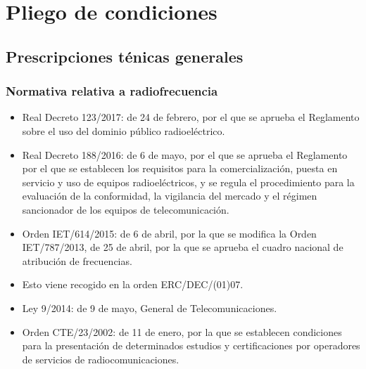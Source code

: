 \documentclass[paper=a4, fontsize=11pt,twoside]{scrartcl}	%
\begin{document}
\section{Pliego de condiciones}
    \subsection{Prescripciones ténicas generales}
        \subsubsection{Normativa relativa a radiofrecuencia}
            \begin{itemize}
                \item Real Decreto 123/2017: de 24 de febrero, por el que se aprueba el Reglamento
                sobre el uso del dominio público radioeléctrico.
                \item Real Decreto 188/2016: de 6 de mayo, por el que se aprueba el Reglamento 
                por el que se establecen los requisitos para la comercialización, puesta en servicio 
                y uso de equipos radioeléctricos, y se regula el procedimiento para la evaluación de
                la conformidad, la vigilancia del mercado y el régimen sancionador de los equipos de
                telecomunicación.
                \item Orden IET/614/2015: de 6 de abril, por la que se modifica la Orden IET/787/2013,
                de 25 de abril, por la que se aprueba el cuadro nacional de atribución de frecuencias.
                \item Esto viene recogido en la orden ERC/DEC/(01)07.
                \item Ley 9/2014: de 9 de mayo, General de Telecomunicaciones.
                \item Orden CTE/23/2002: de 11 de enero, por la que se establecen condiciones para la presentación de determinados
                estudios y certificaciones por operadores de servicios de radiocomunicaciones. 
            \end{itemize}
\end{document}
